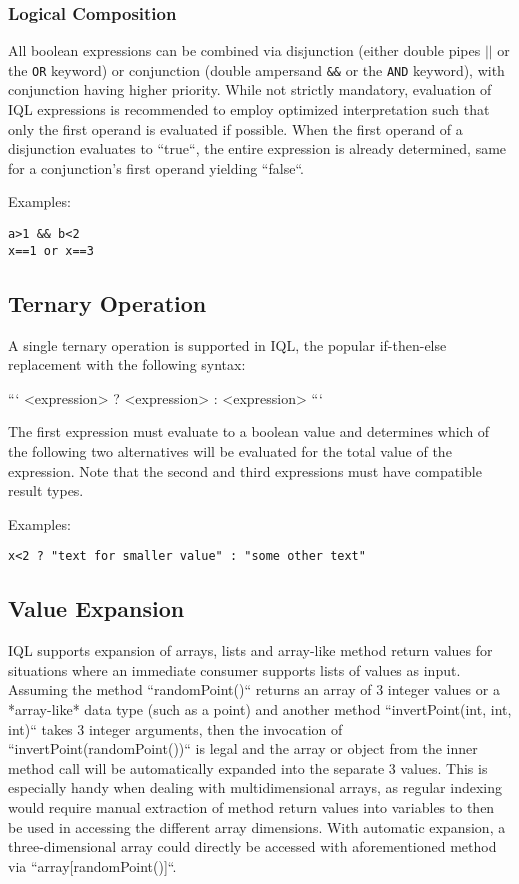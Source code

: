\documentclass[11pt]{article}
\begin{document}
\subsubsection{Logical Composition}
\label{sec:logical-composition}

All boolean expressions can be combined via disjunction (either double pipes \texttt{$||$} or the \texttt{OR} keyword) or conjunction (double ampersand \texttt{\&\&} or the \texttt{AND} keyword), with conjunction having higher priority. While not strictly mandatory, evaluation of IQL expressions is recommended to employ optimized interpretation such that only the first operand is evaluated if possible. When the first operand of a disjunction evaluates to ``true``, the entire expression is already determined, same for a conjunction's first operand yielding ``false``.  

Examples:

\begin{verbatim}
a>1 && b<2
x==1 or x==3
\end{verbatim}

\subsection{Ternary Operation}
\label{sec:ternary-operation}

A single ternary operation is supported in IQL, the popular if-then-else replacement with the following syntax:

```
<expression> ? <expression> : <expression>
```

The first expression must evaluate to a boolean value and determines which of the following two alternatives will be evaluated for the total value of the expression. Note that the second and third expressions must have compatible result types.

Examples:

\begin{verbatim}
x<2 ? "text for smaller value" : "some other text"
\end{verbatim}

\subsection{Value Expansion}
\label{sec:value-expansion}

IQL supports expansion of arrays, lists and array-like method return values for situations where an immediate consumer supports lists of values as input. Assuming the method ``randomPoint()`` returns an array of 3 integer values or a *array-like* data type (such as a point) and another method ``invertPoint(int, int, int)`` takes 3 integer arguments, then the invocation of ``invertPoint(randomPoint())`` is legal and the array or object from the inner method call will be automatically expanded into the separate 3 values. This is especially handy when dealing with multidimensional arrays, as regular indexing would require manual extraction of method return values into variables to then be used in accessing the different array dimensions. With automatic expansion, a three-dimensional array could directly be accessed with aforementioned method via ``array[randomPoint()]``.
\end{document}
